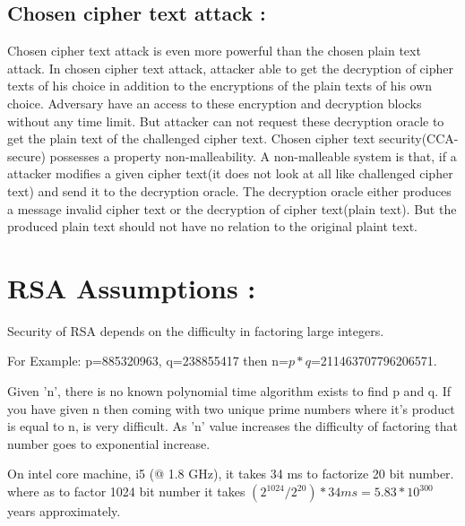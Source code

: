 \documentclass{article}
\begin{document}
	\subsection{Chosen cipher text attack :}
	Chosen cipher text attack is even more powerful than the chosen plain text attack. In chosen cipher text attack, attacker able to get the decryption of cipher texts of his choice in addition to the encryptions of the plain texts of his own choice. Adversary have an access to these encryption and decryption blocks without any time limit. But attacker can not request these decryption oracle to get the plain text of the challenged cipher text.
	Chosen cipher text security(CCA-secure) possesses a property non-malleability. A non-malleable system is that, if a attacker modifies a given cipher text(it does not look at all like challenged cipher text) and send it to the decryption oracle. The decryption oracle either produces a message invalid cipher text or the decryption of cipher text(plain text). But the produced plain text should not have no relation to the original plaint text.
	
	
	\section{RSA Assumptions :}
	Security of RSA depends on the difficulty in factoring large integers. 
	\begin{description}
		
	\item For Example: p=885320963, q=238855417 then
	n=$p*q$=211463707796206571.
	
	Given 'n', there is no known polynomial time algorithm exists to find p and q.	
	If you have given n then coming with two unique prime numbers where it's product is equal to  n, is very difficult. As 'n' value increases the difficulty of factoring that number goes to exponential increase. 
	
	On intel core machine, i5 (@ 1.8 GHz), it takes 34 ms to factorize 20 bit number. where as to factor 1024 bit  number it takes 
	$(2^{1024 }/ 2^{20}) * 34 ms = 5.83 * 10^{300}$ years approximately. 
	
		\end{description}
	
\end{document}
